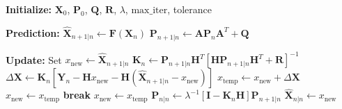 \begin{algorithm}[H]
\caption{Recursive Gauss-Newton Filter Algorithm}
\label{alg:rgnf}
\begin{algorithmic}[1]
    \vspace{2em}
    \State \textbf{Initialize:} $\mathbf{X}_0$, $\mathbf{P}_0$, $\mathbf{Q}$, $\mathbf{R}$, $\lambda$, $\text{max\_iter}$, tolerance
    \vspace{1em}
    
    \State \textbf{Prediction:}
    \vspace{1em}
    \State $\hat{\mathbf{X}}_{n+1|n} \gets \mathbf{F} (\mathbf{X}_n)$
    \vspace{0.5em}
    \State $\mathbf{P}_{n+1|n} \gets \mathbf{A} \mathbf{P}_n \mathbf{A}^T + \mathbf{Q}$
    \vspace{2em}

    \State \textbf{Update:}
    \vspace{1em}
    \State Set $x_{\text{new}} \gets \hat{\mathbf{X}}_{n+1|n}$
    \vspace{1em}
        \vspace{1em}
            \vspace{1em}
            \State $\mathbf{K}_n \gets \mathbf{P}_{n+1|n} \mathbf{H}^T \left[\mathbf{H} \mathbf{P}_{n+1|n} \mathbf{H}^T + \mathbf{R}\right]^{-1}$
            \vspace{1em}
            \State $\Delta \mathbf{X} \gets \mathbf{K}_n \left[\mathbf{Y}_n - \mathbf{H} x_{\text{new}} - \mathbf{H} \left(\hat{\mathbf{X}}_{n+1|n} - x_{\text{new}}\right)\right]$
            \vspace{1em}
            \State $x_{\text{temp}} \gets x_{\text{new}} + \Delta \mathbf{X}$
            \vspace{1em}
                \vspace{1em}
                \State $x_{\text{new}} \gets x_{\text{temp}}$
                \vspace{1em}
                \State \textbf{break}
            \Else
                \vspace{1em}
                \State $x_{\text{new}} \gets x_{\text{temp}}$
                \vspace{1em}
            \EndIf
            \vspace{1em}
        \EndFor
        \vspace{1em}
    \EndIf
    \vspace{1em}
    \State $\mathbf{P}_{n|n} \gets \lambda^{-1} \left[\mathbf{I} - \mathbf{K}_n \mathbf{H}\right] \mathbf{P}_{n+1|n}$
    \vspace{1em}
    \State $\hat{\mathbf{X}}_{n|n} \gets x_{\text{new}}$
    \vspace{2em}
\end{algorithmic}
\end{algorithm}


